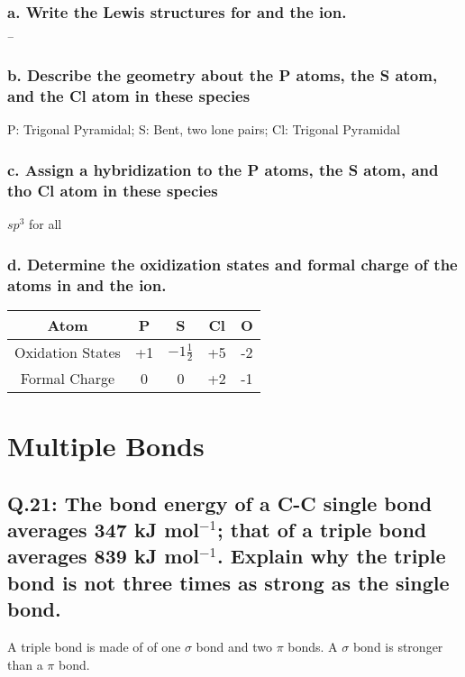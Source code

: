 \documentclass[10pt, letterpaper]{article}
\begin{document}

\subsubsection*{a. Write the Lewis structures for  and the  ion.}

\quad
{}$^{-}$
\subsubsection*{b. Describe the geometry about the P atoms, the S atom, and the Cl atom in these species}
P: Trigonal Pyramidal;
S:  Bent, two lone pairs;
Cl: Trigonal Pyramidal


\subsubsection*{c. Assign a hybridization to the P atoms, the S atom, and tho Cl atom in these species}
$sp^{3}$ for all


\subsubsection*{d. Determine the oxidization states and formal charge of the atoms in 
and the  ion.}


\begin{center}
	\begin{tabular}{|c||c|c|c|c|}
		\hline
        Atom & P & S & Cl & O \\
		\hline \hline
        Oxidation States & +1 & $-1\frac{1}{2}$ & +5 & -2 \\
		\hline
        Formal Charge & 0 & 0 & +2 & -1 \\
	  \hline
     \end{tabular}
\end{center}


\section{Multiple Bonds}

\subsection*{Q.21: The bond energy of a C-C  single bond averages 347 kJ mol$^{-1}$;
that of a  triple bond averages 839 kJ mol$^{-1}$.
Explain why the triple bond is not three times as strong as the single bond.}
A triple bond is made of of one $\sigma$ bond and two $\pi$ bonds.
A $\sigma$ bond is stronger than a $\pi$ bond.
\end{document}
